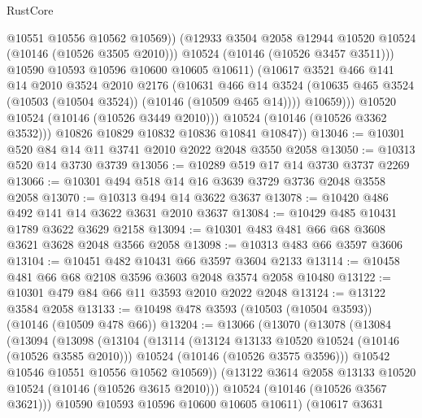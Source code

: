 \begin{lexlean}{RustCore}
\begin{coremodule}
                        @10551
                        @10556
                        @10562
                        @10569))
                    (@12933 @3504 @2058 @12944 @10520 @10524 (@10146 (@10526 @3505 @2010)))
                    @10524
                    (@10146 (@10526 @3457 @3511)))
                  @10590
                  @10593
                  @10596
                  @10600
                  @10605
                  @10611)
                (@10617
                  @3521
                  @466
                  @141
                  @14
                  @2010
                  @3524
                  @2010
                  @2176
                  (@10631
                    @466
                    @14
                    @3524
                    (@10635 @465 @3524 (@10503 (@10504 @3524)) (@10146 (@10509 @465 @14))))
                  @10659)))
            @10520
            @10524
            (@10146 (@10526 @3449 @2010)))
          @10524
          (@10146 (@10526 @3362 @3532)))
        @10826
        @10829
        @10832
        @10836
        @10841
        @10847))
@13046 := @10301 @520 @84 @14 @11 @3741 @2010 @2022 @2048 @3550 @2058
@13050 := @10313 @520 @14 @3730 @3739
@13056 := @10289 @519 @17 @14 @3730 @3737 @2269
@13066 := @10301 @494 @518 @14 @16 @3639 @3729 @3736 @2048 @3558 @2058
@13070 := @10313 @494 @14 @3622 @3637
@13078 := @10420 @486 @492 @141 @14 @3622 @3631 @2010 @3637
@13084 := @10429 @485 @10431 @1789 @3622 @3629 @2158
@13094 := @10301 @483 @481 @66 @68 @3608 @3621 @3628 @2048 @3566 @2058
@13098 := @10313 @483 @66 @3597 @3606
@13104 := @10451 @482 @10431 @66 @3597 @3604 @2133
@13114 := @10458 @481 @66 @68 @2108 @3596 @3603 @2048 @3574 @2058 @10480
@13122 := @10301 @479 @84 @66 @11 @3593 @2010 @2022 @2048
@13124 := @13122 @3584 @2058
@13133 := @10498 @478 @3593 (@10503 (@10504 @3593)) (@10146 (@10509 @478 @66))
@13204 := @13066
    (@13070
      (@13078
        (@13084
          (@13094
            (@13098
              (@13104
                (@13114
                  (@13124 @13133 @10520 @10524 (@10146 (@10526 @3585 @2010)))
                  @10524
                  (@10146 (@10526 @3575 @3596)))
                @10542
                @10546
                @10551
                @10556
                @10562
                @10569))
            (@13122 @3614 @2058 @13133 @10520 @10524 (@10146 (@10526 @3615 @2010)))
            @10524
            (@10146 (@10526 @3567 @3621)))
          @10590
          @10593
          @10596
          @10600
          @10605
          @10611)
        (@10617
          @3631

\end{coremodule}
\end{lexlean}
